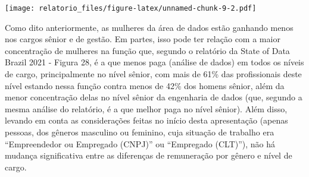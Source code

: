 \documentclass[
]{article}
\begin{document}
\texttt{[image: relatorio\_files/figure-latex/unnamed-chunk-9-2.pdf]}

Como dito anteriormente, as mulheres da área de dados estão ganhando
menos nos cargos sênior e de gestão. Em partes, isso pode ter relação
com a maior concentração de mulheres na função que, segundo o relatório
da State of Data Brazil 2021 - Figura 28, é a que menos paga (análise de
dados) em todos os níveis de cargo, principalmente no nível sênior, com
mais de 61\% das profissionais deste nível estando nessa função contra
menos de 42\% dos homens sênior, além da menor concentração delas no
nível sênior da engenharia de dados (que, segundo a mesma análise do
relatório, é a que melhor paga no nível sênior). Além disso, levando em
conta as considerações feitas no início desta apresentação (apenas
pessoas, dos gêneros masculino ou feminino, cuja situação de trabalho
era ``Empreendedor ou Empregado (CNPJ)'' ou ``Empregado (CLT)''), não há
mudança significativa entre as diferenças de remuneração por gênero e
nível de cargo.
\end{document}
